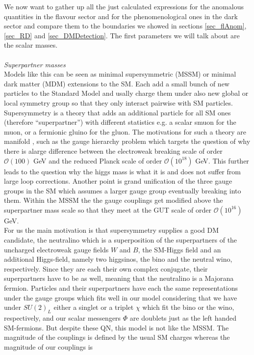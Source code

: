 We now want to gather up all the just calculated expressions for the anomalous quantities in the flavour sector and for the phenomenological ones 
in the dark sector and compare them to the boundaries we showed in sections \ref{sec_flAnom}, \ref{sec_RD} and \ref{sec_DMDetection}. The first
parameters we will talk about are the scalar masses.
\\ \\ \textit{Superpartner masses}\\
Models like this can be seen as minimal supersymmetric (MSSM) or minimal dark matter (MDM) extensions to the SM. Each add a small bunch of new particles to 
the Standard Model and usally charge them under also new global or local symmetry group so that they only interact pairwise with SM particles. 
Supersymmetry is a theory that adds an additional particle for all SM ones (therefore ``superpartner'') with different statistics 
\cite{9709356} e.g. a scalar smuon for the muon, or a fermionic gluino for the gluon. The motivations for such a theory are manifold 
\cite{1302.6587}, such as the gauge hierarchy problem which targets the question of why there is alarge difference between the electroweak breaking 
scale of order $\mathcal{O}(100)$ GeV and the reduced Planck scale of order $\mathcal{O}(10^{18})$ GeV. This further leads to the question why the
higgs mass is what it is and does not suffer from large loop corrections. Another point is grand unification of the three gauge groups in the SM 
which assumes a larger gauge group eventually breaking into them. Within the MSSM the the gauge couplings get modified above the superpartner mass
scale so that they meet at the GUT scale of order $\mathcal{O}(10^{16})$ GeV. \\
\noindent For us the main motivation is that supersymmetry supplies a good DM
candidate, the neutralino which is a superposition of the superpartners of the uncharged electroweak gauge fields $W$ and $B$, the SM-Higgs field and an 
additional Higgs-field, namely two higgsinos, the bino and the neutral wino, respectively. Since they are each their own complex conjugate,
their superpartners have to be as well, meaning that the neutralino is a Majorana fermion. Particles and their superpartners have each the same 
representations under the gauge groups which fits well in our model considering that we have under $SU(2)_L$ either a singlet or a triplet $\chi$
which fit the bino or the wino, respectively, and our scalar messengers $\Phi$ are doublets just as the left handed SM-fermions. But despite these
QN, this model is not like the MSSM. The magnitude of the couplings is defined by the usual SM charges whereas the magnitude of our couplings is 
